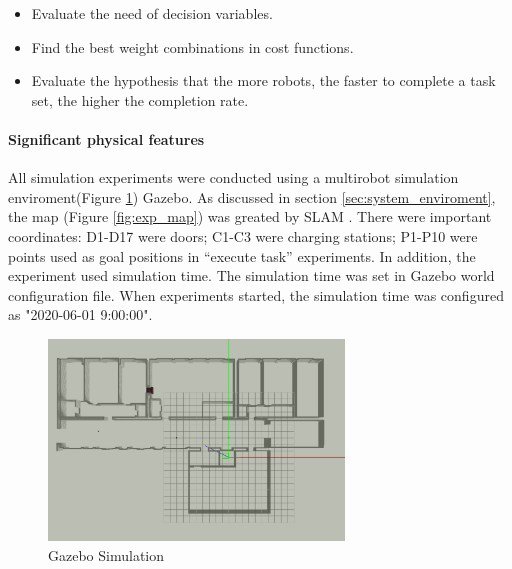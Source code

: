 \begin{itemize}
	\item Evaluate the need of decision variables.
	\item Find the best weight combinations in cost functions.
	\item Evaluate the hypothesis that the more robots, the faster to complete a task set, the higher the completion rate.
\end{itemize}

\paragraph{Significant physical features}
All simulation experiments were conducted using a multirobot simulation enviroment(Figure \ref{fig:gazebo_model}) Gazebo. As discussed in section \ref{sec:system_enviroment}, the map (Figure \ref{fig:exp_map}) was greated by SLAM \cite{slam}. There were important coordinates: D1-D17 were doors; C1-C3 were charging stations; P1-P10 were points used as goal positions in ``execute task'' experiments.
In addition, the experiment used simulation time. The simulation time was set in Gazebo world configuration file. When experiments started, the simulation time was configured as "2020-06-01 9:00:00".

\begin{figure}[htbp]
	\centering
	\includegraphics[width = 0.7\textwidth]{content/images/ch5/gazebo_model.png}
	\caption{Gazebo Simulation}
	\label{fig:gazebo_model}
\end{figure}

